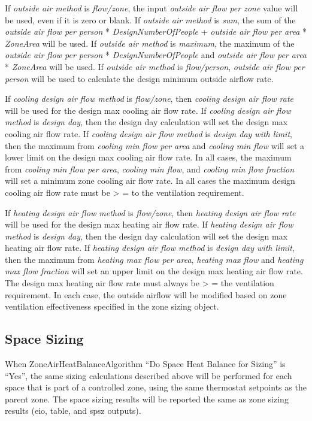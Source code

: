 If \emph{outside air method} is \emph{flow/zone}, the input \emph{outside air flow per zone} value will be used, even if it is zero or blank. If \emph{outside air method} is \emph{sum}, the sum of the \emph{outside air flow per person} * \emph{DesignNumberOfPeople} + \emph{outside air flow per area} * \emph{ZoneArea} will be used. If \emph{outside air method} is \emph{maximum}, the maximum of the \emph{outside air flow per person} * \emph{DesignNumberOfPeople} and \emph{outside air flow per area} * \emph{ZoneArea} will be used. If \emph{outside air method} is \emph{flow/person}, \emph{outside air flow per person} will be used to calculate the design minimum outside airflow rate.

If \emph{cooling design air flow method} is \emph{flow/zone}, then \emph{cooling design air flow rate} will be used for the design max cooling air flow rate. If \emph{cooling design air flow method} is \emph{design day}, then the design day calculation will set the design max cooling air flow rate. If \emph{cooling design air flow method} is \emph{design day with limit}, then the maximum from \emph{cooling min flow per area} and \emph{cooling min flow} will set a lower limit on the design max cooling air flow rate. In all cases, the maximum from \emph{cooling min flow per area}, \emph{cooling min flow}, and \emph{cooling min flow fraction} will set a minimum zone cooling air flow rate. In all cases the maximum design cooling air flow rate must be \textgreater{} = to the ventilation requirement.

If \emph{heating design air flow method} is \emph{flow/zone}, then \emph{heating design air flow rate} will be used for the design max heating air flow rate. If \emph{heating design air flow method} is \emph{design day}, then the design day calculation will set the design max heating air flow rate. If \emph{heating design air flow method} is \emph{design day with limit}, then the maximum from \emph{heating max flow per area}, \emph{heating max flow} and \emph{heating max flow fraction} will set an upper limit on the design max heating air flow rate. The design max heating air flow rate must always be \textgreater{} = the ventilation requirement. In each case, the outside airflow will be modified based on zone ventilation effectiveness specified in the zone sizing object.

\subsection{Space Sizing}\label{space-sizing}
When ZoneAirHeatBalanceAlgorithm ``Do Space Heat Balance for Sizing'' is ``Yes'', the same sizing calculations described above will be performed for each space that is part of a controlled zone, using the same thermostat setpoints as the parent zone. The space sizing results will be reported the same as zone sizing results (eio, table, and spsz outputs).

